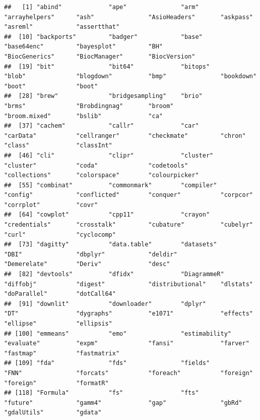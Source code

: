 \documentclass[
  12pt,
]{book}
\begin{document}
\begin{verbatim}
##   [1] "abind"             "ape"               "arm"               "arrayhelpers"      "ash"               "AsioHeaders"       "askpass"           "asreml"            "assertthat"       
##  [10] "backports"         "badger"            "base"              "base64enc"         "bayesplot"         "BH"                "BiocGenerics"      "BiocManager"       "BiocVersion"      
##  [19] "bit"               "bit64"             "bitops"            "blob"              "blogdown"          "bmp"               "bookdown"          "boot"              "boot"             
##  [28] "brew"              "bridgesampling"    "brio"              "brms"              "Brobdingnag"       "broom"             "broom.mixed"       "bslib"             "ca"               
##  [37] "cachem"            "callr"             "car"               "carData"           "cellranger"        "checkmate"         "chron"             "class"             "classInt"         
##  [46] "cli"               "clipr"             "cluster"           "cluster"           "coda"              "codetools"         "collections"       "colorspace"        "colourpicker"     
##  [55] "combinat"          "commonmark"        "compiler"          "config"            "conflicted"        "conquer"           "corpcor"           "corrplot"          "covr"             
##  [64] "cowplot"           "cpp11"             "crayon"            "credentials"       "crosstalk"         "cubature"          "cubelyr"           "curl"              "cyclocomp"        
##  [73] "dagitty"           "data.table"        "datasets"          "DBI"               "dbplyr"            "deldir"            "Demerelate"        "Deriv"             "desc"             
##  [82] "devtools"          "dfidx"             "DiagrammeR"        "diffobj"           "digest"            "distributional"    "dlstats"           "doParallel"        "dotCall64"        
##  [91] "downlit"           "downloader"        "dplyr"             "DT"                "dygraphs"          "e1071"             "effects"           "ellipse"           "ellipsis"         
## [100] "emmeans"           "emo"               "estimability"      "evaluate"          "expm"              "fansi"             "farver"            "fastmap"           "fastmatrix"       
## [109] "fda"               "fds"               "fields"            "FNN"               "forcats"           "foreach"           "foreign"           "foreign"           "formatR"          
## [118] "Formula"           "fs"                "fts"               "future"            "gamm4"             "gap"               "gbRd"              "gdalUtils"         "gdata"            

\end{verbatim}
\end{document}
